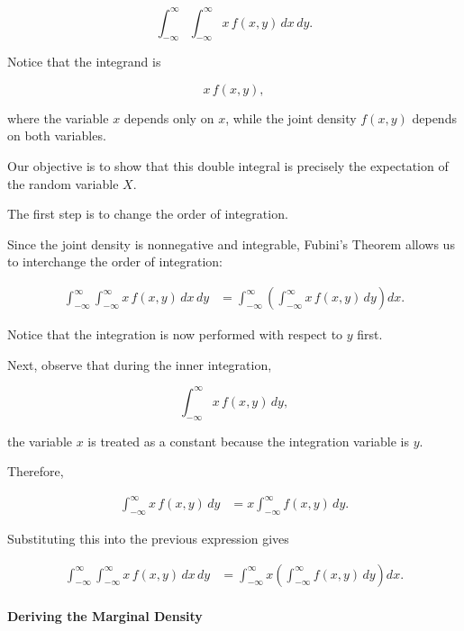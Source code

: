 \documentclass[11pt]{article}
\begin{document}
\begin{mdframed}[
		linewidth=0.8pt,
		roundcorner=6pt,
		backgroundcolor=gray!5,
		linecolor=gray!60,
		innertopmargin=10pt,
		innerbottommargin=10pt,
		innerleftmargin=10pt,
		innerrightmargin=10pt
		]
		\[
		\int_{-\infty}^{\infty}
		\int_{-\infty}^{\infty}
		x\,f(x,y)\,dx\,dy.
		\]
		
		Notice that the integrand is
		
		\[
		x\,f(x,y),
		\]
		
		where the variable \(x\) depends only on \(x\), while the joint density
		\(f(x,y)\) depends on both variables.
		
		Our objective is to show that this double integral is precisely the
		expectation of the random variable \(X\).
		
		\bigskip
		
		The first step is to change the order of integration.
		
		Since the joint density is nonnegative and integrable, Fubini's Theorem
		allows us to interchange the order of integration:
		
		\[
		\begin{aligned}
			\int_{-\infty}^{\infty}
			\int_{-\infty}^{\infty}
			x\,f(x,y)
			\,dx\,dy
			&=
			\int_{-\infty}^{\infty}
			\left(
			\int_{-\infty}^{\infty}
			x\,f(x,y)
			\,dy
			\right)
			dx.
		\end{aligned}
		\]
		
		Notice that the integration is now performed with respect to \(y\) first.
		
		\bigskip
		
		Next, observe that during the inner integration,
		
		\[
		\int_{-\infty}^{\infty}
		x\,f(x,y)\,dy,
		\]
		
		the variable \(x\) is treated as a constant because the integration variable
		is \(y\).
		
		Therefore,
		
		\[
		\begin{aligned}
			\int_{-\infty}^{\infty}
			x\,f(x,y)\,dy
			&=
			x
			\int_{-\infty}^{\infty}
			f(x,y)\,dy.
		\end{aligned}
		\]
		
		Substituting this into the previous expression gives
		
		\[
		\begin{aligned}
			\int_{-\infty}^{\infty}
			\int_{-\infty}^{\infty}
			x\,f(x,y)
			\,dx\,dy
			&=
			\int_{-\infty}^{\infty}
			x
			\left(
			\int_{-\infty}^{\infty}
			f(x,y)\,dy
			\right)
			dx.
		\end{aligned}
		\]
		
		\bigskip
		
		\paragraph{Deriving the Marginal Density}
		

\end{mdframed}
\end{document}
